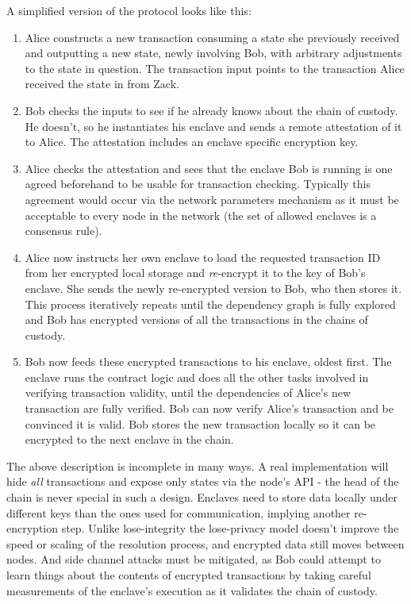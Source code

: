 \documentclass{article}
\begin{document}
A simplified version of the protocol looks like this:

\begin{enumerate}
    \item Alice constructs a new transaction consuming a state she previously received and outputting a new state,
          newly involving Bob, with arbitrary adjustments to the state in question. The transaction input points
          to the transaction Alice received the state in from Zack.
    \item Bob checks the inputs to see if he already knows about the chain of custody. He doesn't, so he
          instantiates his enclave and sends a remote attestation of it to Alice. The attestation includes an enclave
          specific encryption key.
    \item Alice checks the attestation and sees that the enclave Bob is running is one agreed beforehand
          to be usable for transaction checking. Typically this agreement would occur via the network parameters
          mechanism as it must be acceptable to every node in the network (the set of allowed enclaves is a
          consensus rule).
    \item Alice now instructs her own enclave to load the requested transaction ID from her encrypted local storage
          and \emph{re}-encrypt it to the key of Bob's enclave. She sends the newly re-encrypted version to Bob,
          who then stores it. This process iteratively repeats until the dependency graph is fully explored and Bob
          has encrypted versions of all the transactions in the chains of custody.
    \item Bob now feeds these encrypted transactions to his enclave, oldest first. The enclave runs the contract
          logic and does all the other tasks involved in verifying transaction validity, until the dependencies
          of Alice's new transaction are fully verified. Bob can now verify Alice's transaction and be convinced
          it is valid. Bob stores the new transaction locally so it can be encrypted to the next enclave in the
          chain.
\end{enumerate}

The above description is incomplete in many ways. A real implementation will hide \emph{all} transactions and
expose only states via the node's API - the head of the chain is never special in such a design. Enclaves need to
store data locally under different keys than the ones used for communication, implying another re-encryption step.
Unlike lose-integrity the lose-privacy model doesn't improve the speed or scaling of the resolution process, and
encrypted data still moves between nodes. And side channel attacks must be mitigated, as Bob could attempt to learn
things about the contents of encrypted transactions by taking careful measurements of the enclave's execution as it
validates the chain of custody.
\end{document}
